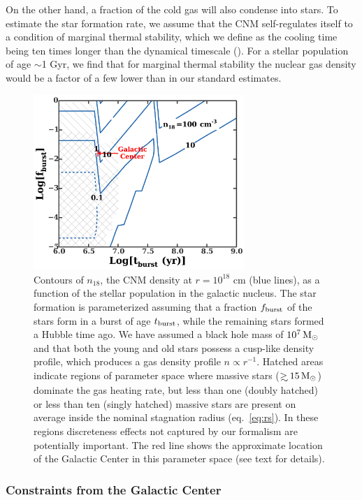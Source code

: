 \documentclass[usenatbib,fleqn]{mnras}
\newcommand\gsim{\mathrel{\rlap{\lower4pt\hbox{\hskip1pt$\sim$}}
    \raise1pt\hbox{$>$}}}
\newcommand{\Msun}{{\rm M_\odot}}
\begin{document}
On the other hand, a fraction of the cold gas will also condense into
stars.  To estimate the star formation rate, we assume that the CNM
self-regulates itself to a condition of marginal thermal stability,
which we define as the cooling time being ten times longer than the
dynamical timescale (\citealt{McCourt+2012}). For a stellar population
of age $\sim$1 Gyr, we find that for marginal thermal stability the
nuclear gas density would be a factor of a few lower than in our
standard estimates.


\begin{figure} 
  \includegraphics[width=8cm]{cnm_plot.pdf}
  \caption{\label{fig:param} Contours of $n_{18}$, the CNM density at
    $r = 10^{18}$ cm (blue lines), as a function of the stellar
    population in the galactic nucleus.  The star formation is
    parameterized assuming that a fraction $f_{\rm burst}$ of the
    stars form in a burst of age $t_{\rm burst}$, while the remaining
    stars formed a Hubble time ago.  We have assumed a black hole mass
    of $10^{7} \, \Msun$ and that both the young and old stars possess
    a cusp-like density profile, which produces a gas density profile
    $n \propto r^{-1}$.  Hatched areas indicate regions of parameter
    space where massive stars ($\gsim 15 \, \Msun$) dominate the gas
    heating rate, but less than one (doubly hatched) or less than ten
    (singly hatched) massive stars are present on average inside the
    nominal stagnation radius (eq.~\ref{eq:rs}).  In these regions
    discreteness effects not captured by our formalism are potentially
    important. The red line shows the approximate location of the
    Galactic Center in this parameter space (see text for details).}
\end{figure}


\subsubsection{Constraints from the Galactic Center}
\label{sec:empirical}
\end{document}
